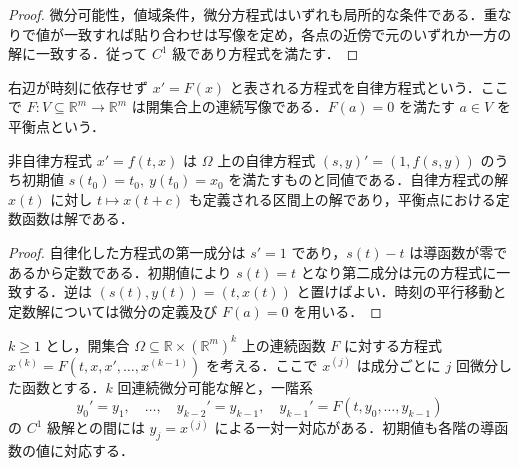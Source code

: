 \begin{proof}
微分可能性，値域条件，微分方程式はいずれも局所的な条件である．重なりで値が一致すれば貼り合わせは写像を定め，各点の近傍で元のいずれか一方の解に一致する．従って $C^1$ 級であり方程式を満たす．
\end{proof}
\begin{defn}[自律方程式と平衡点]
右辺が時刻に依存せず $x'=F(x)$ と表される方程式を自律方程式という．ここで $F:V\subseteq\mathbb R^m\to\mathbb R^m$ は開集合上の連続写像である．$F(a)=0$ を満たす $a\in V$ を平衡点という．
\end{defn}
\begin{prop}[自律化と時刻の平行移動]
非自律方程式 $x'=f(t,x)$ は $\Omega$ 上の自律方程式 $(s,y)'=(1,f(s,y))$ のうち初期値 $s(t_0)=t_0,\ y(t_0)=x_0$ を満たすものと同値である．自律方程式の解 $x(t)$ に対し $t\mapsto x(t+c)$ も定義される区間上の解であり，平衡点における定数函数は解である．
\end{prop}
\begin{proof}
自律化した方程式の第一成分は $s'=1$ であり，$s(t)-t$ は導函数が零であるから定数である．初期値により $s(t)=t$ となり第二成分は元の方程式に一致する．逆は $(s(t),y(t))=(t,x(t))$ と置けばよい．時刻の平行移動と定数解については微分の定義及び $F(a)=0$ を用いる．
\end{proof}
\begin{prop}[高階方程式の一階連立方程式への帰着]
$k\geq1$ とし，開集合 $\Omega\subseteq\mathbb R\times(\mathbb R^m)^k$ 上の連続函数 $F$ に対する方程式 $x^{(k)}=F(t,x,x',\ldots,x^{(k-1)})$ を考える．ここで $x^{(j)}$ は成分ごとに $j$ 回微分した函数とする．$k$ 回連続微分可能な解と，一階系
\[
y_0'=y_1,\quad\ldots,\quad y_{k-2}'=y_{k-1},\quad y_{k-1}'=F(t,y_0,\ldots,y_{k-1})
\]
の $C^1$ 級解との間には $y_j=x^{(j)}$ による一対一対応がある．初期値も各階の導函数の値に対応する．
\end{prop}
